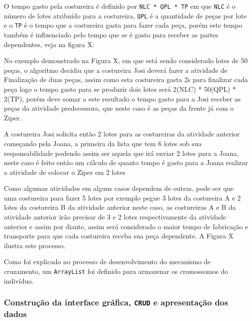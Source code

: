  \par O tempo gasto pela costureira é definido por \texttt{NLC * QPL * TP} em que \texttt{NLC} é o número de lotes atribuído
 para a costureira, \texttt{QPL} é a quantidade de peças por lote e o \texttt{TP} é o tempo que a costureira gasta para fazer
 cada peça, porém este tempo também é influenciado pelo tempo que se é gasto para receber as partes dependentes, veja na figura
 X:
 
\par No exemplo demonstrado na Figura X, em que está sendo considerado lotes de 50 peças, o algoritmo decidiu que 
a costureira Josi deverá fazer a atividade de Finalização de duas peças, assim como esta costureira gasta 2s para 
finalizar cada peça logo o tempo gasto para se produzir dois lotes será 2(NLC) * 50(QPL) * 2(TP), porém deve somar
a este resultado o tempo gasto para a Josi receber as peças da atividade predecessora, que neste caso é as peças 
da frente já com o Ziper.
\par A costureira Josi solicita então 2 lotes para as costureiras da atividade anterior começando pela Joana, a primeira
da lista que tem 6 lotes sob sua responsabilidade podendo assim ser aquela que irá enviar 2 lotes para a Joana, neste 
caso é feito então um cálculo de quanto tempo é gasto para a Joana realizar a atividade de colocar o Ziper em 2 lotes
 
Como algumas
atividades em alguns casos dependem de outras, pode ser que uma costureira para fazer 5 lotes por exemplo pegue 3 lotes da
costureira A e 2 lotes da costureira B da atividade anterior neste caso, as costureiras A e B da atividade anterior irão
precisar de 3 e 2 lotes respectivamente da atividade anterior e assim por diante, assim será considerado o maior tempo 
de fabricação e transporte para que cada costureira receba sua peça dependente. A Figura X ilustra este processo.

\par Como foi explicado no processo de desenvolvimento do mecanismo de cruzamento, um \texttt{ArrayList} foi definido para armazenar
os cromossomos do indivíduo.



\subsubsection{Construção da interface gráfica, \texttt{CRUD} e apresentação dos dados}



